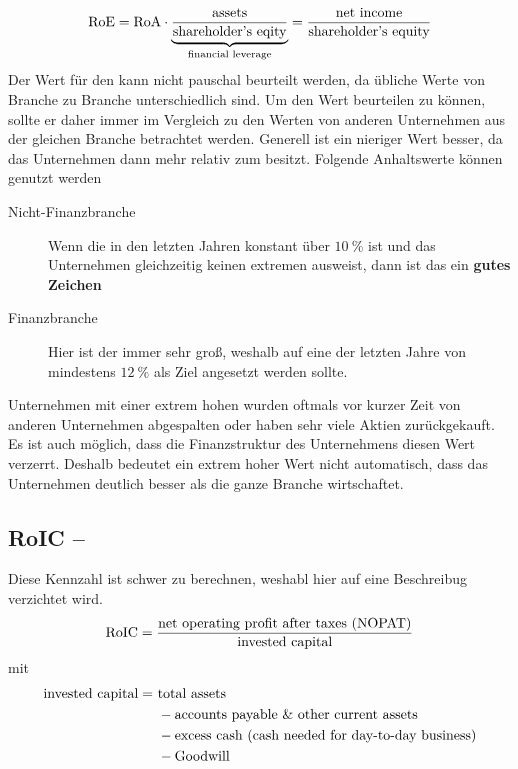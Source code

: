 \begin{equation}
    \text{RoE} = \text{RoA} \cdot \underbrace{\frac{\text{assets}}{\text{shareholder's eqity}}}_{\text{financial leverage}} = \frac{\text{net income}}{\text{shareholder's equity}}
\end{equation}
Der Wert für den \financialLeverage kann nicht pauschal beurteilt werden, da übliche Werte von Branche zu Branche unterschiedlich sind. 
Um den Wert beurteilen zu können, sollte er daher immer im Vergleich zu den Werten von anderen Unternehmen aus der gleichen Branche betrachtet werden.
Generell ist ein nieriger Wert besser, da das Unternehmen dann mehr \shareholdersEquity relativ zum \assets besitzt.
Folgende Anhaltswerte können genutzt werden
\begin{description}
    \item[Nicht-Finanzbranche] Wenn die \returnOnEquity in den letzten Jahren konstant über $\SI{10}{\percent}$ ist und das Unternehmen gleichzeitig keinen extremen \financialLeverage ausweist, dann ist das ein \textbf{gutes Zeichen}
    \item[Finanzbranche] Hier ist der \financialLeverage immer sehr groß, weshalb auf eine \returnOnEquity der letzten Jahre von mindestens $\SI{12}{\percent}$ als Ziel angesetzt werden sollte.
\end{description}
Unternehmen mit einer extrem hohen \returnOnEquity wurden oftmals vor kurzer Zeit von anderen Unternehmen abgespalten oder haben sehr viele Aktien zurückgekauft. 
Es ist auch möglich, dass die Finanzstruktur des Unternehmens diesen Wert verzerrt.
Deshalb bedeutet ein extrem hoher Wert nicht automatisch, dass das Unternehmen deutlich besser als die ganze Branche wirtschaftet. 

%
\subsection{RoIC -- }

Diese Kennzahl ist schwer zu berechnen, weshabl hier auf eine Beschreibug verzichtet wird.
\begin{equation}
    \text{RoIC} = \frac{\text{net operating profit after taxes (NOPAT)}}{\text{invested capital}}
\end{equation}
mit
\begin{align}
    \begin{split}
        \text{invested capital} =\ &\text{total assets}\\ &- \text{accounts payable \& other current assets} \\ &- \text{excess cash (cash needed for day-to-day business)}\\ &- \text{Goodwill}
    \end{split}
\end{align}


